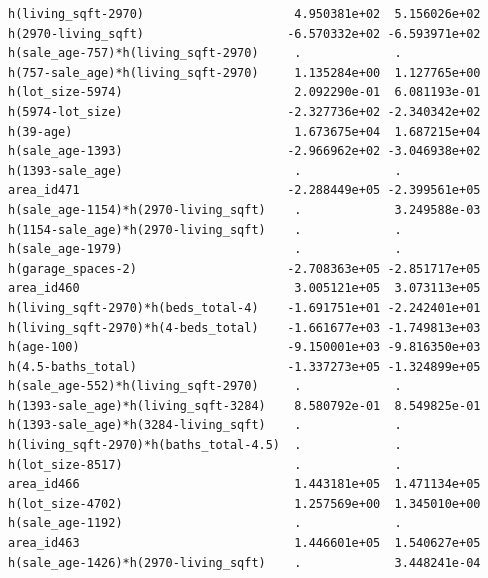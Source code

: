 \documentclass[
]{article}
\begin{document}
\begin{verbatim}
h(living_sqft-2970)                     4.950381e+02  5.156026e+02
h(2970-living_sqft)                    -6.570332e+02 -6.593971e+02
h(sale_age-757)*h(living_sqft-2970)     .             .           
h(757-sale_age)*h(living_sqft-2970)     1.135284e+00  1.127765e+00
h(lot_size-5974)                        2.092290e-01  6.081193e-01
h(5974-lot_size)                       -2.327736e+02 -2.340342e+02
h(39-age)                               1.673675e+04  1.687215e+04
h(sale_age-1393)                       -2.966962e+02 -3.046938e+02
h(1393-sale_age)                        .             .           
area_id471                             -2.288449e+05 -2.399561e+05
h(sale_age-1154)*h(2970-living_sqft)    .             3.249588e-03
h(1154-sale_age)*h(2970-living_sqft)    .             .           
h(sale_age-1979)                        .             .           
h(garage_spaces-2)                     -2.708363e+05 -2.851717e+05
area_id460                              3.005121e+05  3.073113e+05
h(living_sqft-2970)*h(beds_total-4)    -1.691751e+01 -2.242401e+01
h(living_sqft-2970)*h(4-beds_total)    -1.661677e+03 -1.749813e+03
h(age-100)                             -9.150001e+03 -9.816350e+03
h(4.5-baths_total)                     -1.337273e+05 -1.324899e+05
h(sale_age-552)*h(living_sqft-2970)     .             .           
h(1393-sale_age)*h(living_sqft-3284)    8.580792e-01  8.549825e-01
h(1393-sale_age)*h(3284-living_sqft)    .             .           
h(living_sqft-2970)*h(baths_total-4.5)  .             .           
h(lot_size-8517)                        .             .           
area_id466                              1.443181e+05  1.471134e+05
h(lot_size-4702)                        1.257569e+00  1.345010e+00
h(sale_age-1192)                        .             .           
area_id463                              1.446601e+05  1.540627e+05
h(sale_age-1426)*h(2970-living_sqft)    .             3.448241e-04
                                                                  

\end{verbatim}
\end{document}
